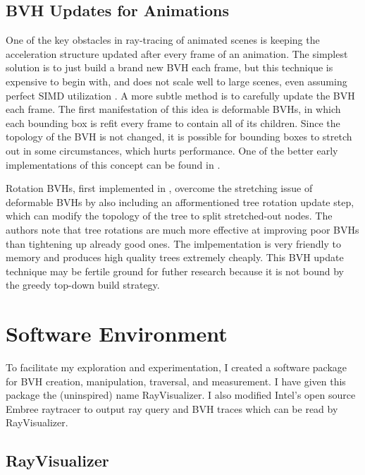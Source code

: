 \documentclass[twocolumn]{article}
\begin{document}
\subsection{BVH Updates for Animations}

One of the key obstacles in ray-tracing of animated scenes is keeping the acceleration structure updated after every frame of an animation.  The simplest solution is to just build a brand new BVH each frame, but this technique is expensive to begin with, and does not scale well to large scenes, even assuming perfect SIMD utilization \cite{Kopta11}.  A more subtle method is to carefully update the BVH each frame.  The first manifestation of this idea is deformable BVHs, in which each bounding box is refit every frame to contain all of its children.  Since the topology of the BVH is not changed, it is possible for bounding boxes to stretch out in some circumstances, which hurts performance.  One of the better early implementations of this concept can be found in \cite{Wald07}.  

Rotation BVHs, first implemented in \cite{Kopta11}, overcome the stretching issue of deformable BVHs by also including an afformentioned tree rotation update step, which can modify the topology of the tree to split stretched-out nodes.  The authors note that tree rotations are much more effective at improving poor BVHs than tightening up already good ones.  The imlpementation is very friendly to memory and produces high quality trees extremely cheaply.  This BVH update technique may be fertile ground for futher research because it is not bound by the greedy top-down build strategy.



\section{Software Environment}

To facilitate my exploration and experimentation, I created a software package for BVH creation, manipulation, traversal, and measurement.  I have given this package the (uninspired) name RayVisualizer.  I also modified Intel's open source Embree raytracer to output ray query and BVH traces which can be read by RayVisualizer.

\subsection{RayVisualizer}
\end{document}
